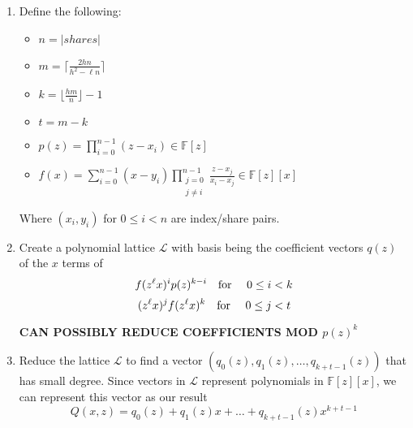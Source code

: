 \documentclass[10pt]{article}
\newcommand{\barred}[1]
	{\left| #1 \right|}
\newcommand{\paren}[1]
	{\left( #1 \right)}
\begin{document}
\begin{enumerate}
\item Define the following:
		\begin{itemize}
		\item $n = \barred{shares}$
		\item $m = \lceil \frac{2hn}{h^2-\ell n} \rceil$
		\item $k = \lfloor \frac{hm}{n} \rfloor - 1$
		\item $t = m - k$
		\item $p(z) = \displaystyle\prod_{i=0}^{n-1}\paren{z-x_i} \in \mathbb{F}[z]$
		\item $f(x) = \displaystyle\sum_{i=0}^{n-1}\paren{x-y_i}\displaystyle\prod_{\substack{j=0\\j \neq i}}^{n-1}\frac{z-x_j}{x_i-x_j} 
						\in \mathbb{F}[z][x]$
		\end{itemize}
		Where $\paren{x_i,y_i}$ for $0 \leq i < n$ are index/share pairs.
		
\newpage
\item Create a polynomial lattice $\mathcal{L}$ with basis being the coefficient vectors $q(z)$ of the $x$ terms of
		\[f(z^\ell x)^ip(z)^{k-i} \textrm{\quad for \quad} 0 \leq i < k\]
		\[(z^\ell x)^jf(z^\ell x)^k \textrm{\quad for \quad} 0 \leq j < t\]
		
		\textbf{CAN POSSIBLY REDUCE COEFFICIENTS MOD $p(z)^k$}

\item Reduce the lattice $\mathcal{L}$ to find a vector $\paren{q_0(z), q_1(z), \ldots, q_{k+t-1}(z)}$ that has small degree.
		Since vectors in $\mathcal{L}$ represent polynomials in $\mathbb{F}[z][x]$, we can represent this vector as our result 
		\[Q(x,z) = q_0(z)+q_1(z)x+\ldots+q_{k+t-1}(z)x^{k+t-1}\]
\end{enumerate}
\end{document}
